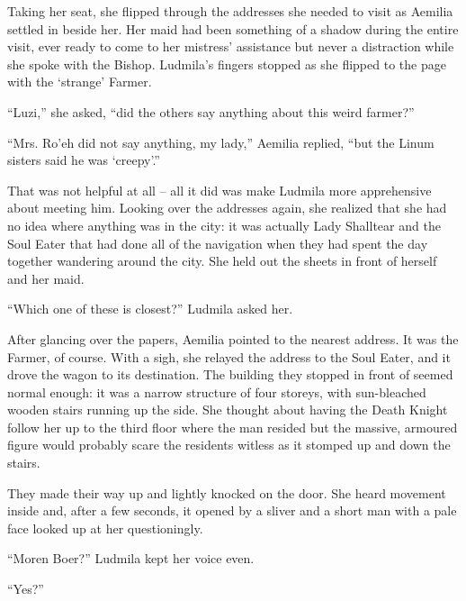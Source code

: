  

Taking her seat, she flipped through the addresses she needed to visit as Aemilia settled in beside her. Her maid had been something of a shadow during the entire visit, ever ready to come to her mistress’ assistance but never a distraction while she spoke with the Bishop. Ludmila’s fingers stopped as she flipped to the page with the ‘strange’ Farmer.

 

“Luzi,” she asked, “did the others say anything about this weird farmer?”

 

“Mrs. Ro’eh did not say anything, my lady,” Aemilia replied, “but the Linum sisters said he was ‘creepy’.”

 

That was not helpful at all – all it did was make Ludmila more apprehensive about meeting him. Looking over the addresses again, she realized that she had no idea where anything was in the city: it was actually Lady Shalltear and the Soul Eater that had done all of the navigation when they had spent the day together wandering around the city. She held out the sheets in front of herself and her maid.

 

“Which one of these is closest?” Ludmila asked her.

 

After glancing over the papers, Aemilia pointed to the nearest address. It was the Farmer, of course. With a sigh, she relayed the address to the Soul Eater, and it drove the wagon to its destination. The building they stopped in front of seemed normal enough: it was a narrow structure of four storeys, with sun-bleached wooden stairs running up the side. She thought about having the Death Knight follow her up to the third floor where the man resided but the massive, armoured figure would probably scare the residents witless as it stomped up and down the stairs.

 

They made their way up and lightly knocked on the door. She heard movement inside and, after a few seconds, it opened by a sliver and a short man with a pale face looked up at her questioningly.

 

“Moren Boer?” Ludmila kept her voice even.

 

“Yes?”

 

